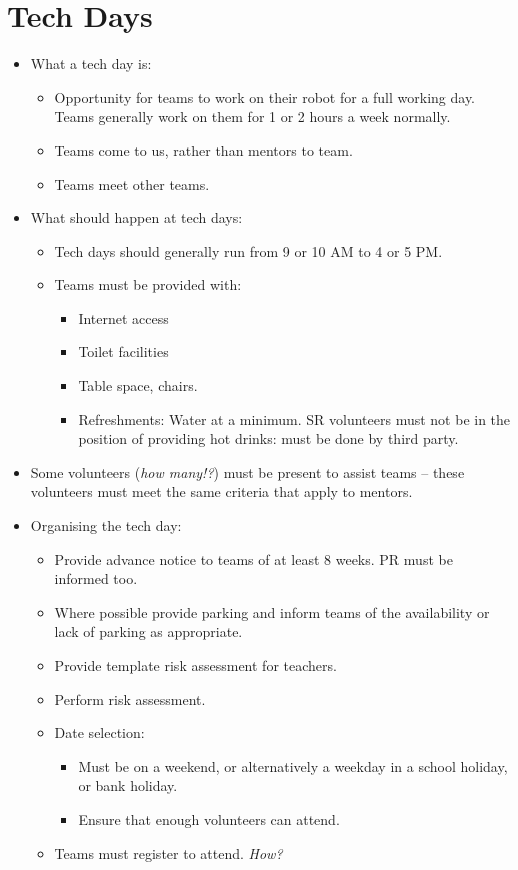 \section{Tech Days}

\begin{itemize}
\item What a tech day is:
  \begin{itemize}
  \item Opportunity for teams to work on their robot for a full working day.  Teams generally work on them for 1 or 2 hours a week normally.
  \item Teams come to us, rather than mentors to team.
  \item Teams meet other teams.
  \end{itemize}


\item What should happen at tech days:
  \begin{itemize}
  \item Tech days should generally run from 9 or 10 AM to 4 or 5 PM.
  \item Teams must be provided with:
    \begin{itemize}
    \item Internet access
    \item Toilet facilities
    \item Table space, chairs.
    \item Refreshments: Water at a minimum.  SR volunteers must not be in the position of providing hot drinks: must be done by third party.
    \end{itemize}
  \end{itemize}

\item Some volunteers (\textit{how many!?}) must be present to assist teams -- these volunteers must meet the same criteria that apply to mentors.

\item  Organising the tech day:
  \begin{itemize}
  \item Provide advance notice to teams of at least 8 weeks.  PR must be informed too.
  \item Where possible provide parking and inform teams of the availability or lack of parking as appropriate.
  \item Provide template risk assessment for teachers.
  \item Perform risk assessment.
  \item Date selection:
    \begin{itemize}
    \item Must be on a weekend, or alternatively a weekday in a school holiday, or bank holiday.
    \item Ensure that enough volunteers can attend.
    \end{itemize}
  \item Teams must register to attend.  \textit{How?}
  \end{itemize}

\end{itemize}
